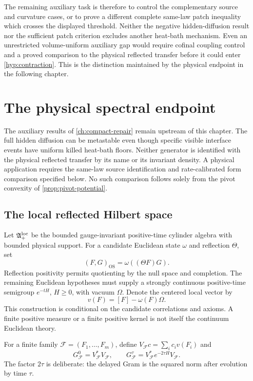 \documentclass[11pt,oneside,openany]{book}
\theoremstyle{definition}
\theoremstyle{remark}
\newcommand{\OS}{\mathrm{OS}}
\begin{document}
The remaining auxiliary task is therefore to control the complementary
source and curvature cases, or to prove a different complete
same-law patch inequality which crosses the displayed threshold.
Neither the negative hidden-diffusion result nor the sufficient patch
criterion excludes another heat-bath mechanism. Even an unrestricted
volume-uniform auxiliary gap would require cofinal coupling control
and a proved comparison to the physical reflected transfer before it
could enter \cref{hyp:contraction}. This is the distinction maintained
by the physical endpoint in the following chapter.

\chapter{The physical spectral endpoint}
\label{ch:spectral}
The auxiliary results of \cref{ch:compact-repair} remain upstream of
this chapter. The full hidden diffusion can be metastable even though
specific visible interface events have uniform killed heat-bath floors.
Neither generator is identified with the physical reflected transfer by
its name or its invariant density. A physical application requires the
same-law source identification and rate-calibrated form comparison
specified below. No such comparison follows solely from the pivot
convexity of \cref{prop:pivot-potential}.

\section{The local reflected Hilbert space}
Let $\mathfrak A_+^{\rm loc}$ be the bounded gauge-invariant positive-time cylinder algebra with bounded physical support. For a candidate Euclidean state $\omega$ and reflection $\Theta$, set
\[
(F,G)_{\OS}=\omega((\Theta F)G).
\]
Reflection positivity permits quotienting by the null space and completion. The remaining Euclidean hypotheses must supply a strongly continuous positive-time semigroup $e^{-tH}$, $H\ge0$, with vacuum $\Omega$. Denote the centered local vector by
\[
v(F)=[F]-\omega(F)\Omega.
\]
This construction is conditional on the candidate correlations and axioms. A finite positive measure or a finite positive kernel is not itself the continuum Euclidean theory.

For a finite family $\mathcal F=(F_1,\ldots,F_m)$, define $V_{\mathcal F}c=\sum_ic_iv(F_i)$ and
\begin{equation}\label{eq:localGrams}
G_{\mathcal F}^{0}=V_{\mathcal F}^*V_{\mathcal F},\qquad
G_{\mathcal F}^{\tau}=V_{\mathcal F}^*e^{-2\tau H}V_{\mathcal F}.
\end{equation}
The factor $2\tau$ is deliberate: the delayed Gram is the squared norm after evolution by time $\tau$.
\end{document}
